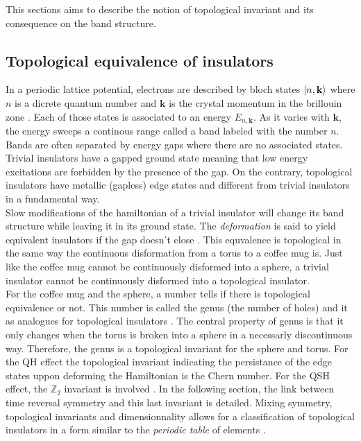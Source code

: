 This sections aims to describe the notion of topological invariant and its consequence on the band structure. 
\subsection{Topological equivalence of insulators}
In a periodic lattice potential, electrons are described by bloch states $\ket{n, \mathbf{k}}$ where $n$ is a dicrete quantum number and $\mathbf{k}$ is the crystal momentum in the brillouin zone \cite{shankar_topological_2018}. Each of those states is associated to an energy $E_{n, \mathbf{k}}$.  As it varies with $\mathbf{k}$, the energy sweeps a continous range called a band labeled with the number $n$. Bands are often separated by energy gaps where there are no associated states. Trivial insulators have a gapped ground state meaning that low energy excitations are forbidden by the presence of the gap. On the contrary, topological insulators have metallic (gapless) edge states\cite{kane_topological_2013} and different from trivial insulators in a fundamental way.\\ 

Slow modifications of the hamiltonian of a trivial insulator will change its band structure while leaving it in its ground state. The \textit{deformation} is said to yield equivalent insulators if the gap doesn't close \cite{kane_topological_2013}. This equvalence is topological in the same way the continuous disformation from a torus to a coffee mug is. Just like the coffee mug cannot be continuously disformed into a sphere, a trivial insulator cannot be continuously disformed into a topological insulator.\\

For the coffee mug and the sphere, a number tells if there is topological equivalence or not. This number is called the genus (the number of holes) and it as analogues for topological insulators \cite{batra_physics_2020}. The central property of genus is that it only changes when the torus is broken into a sphere in a necessarly discontinuous way. Therefore, the genus is a topological invariant for the sphere and torus. For the QH effect the topological invariant indicating the persistance of the edge states uppon deforming the Hamiltonian is the Chern number. For the QSH effect, the $\mathbb{Z}_2$ invariant is involved \cite{kane_topological_2013}. In the following section, the link between time reversal symmetry and this last invariant is detailed.  Mixing symmetry, topological invariants and dimensionnality allows for a classification of topological insulators in a form similar to the \textit{periodic table} of elements \cite{hasan_topological_2010}. 

